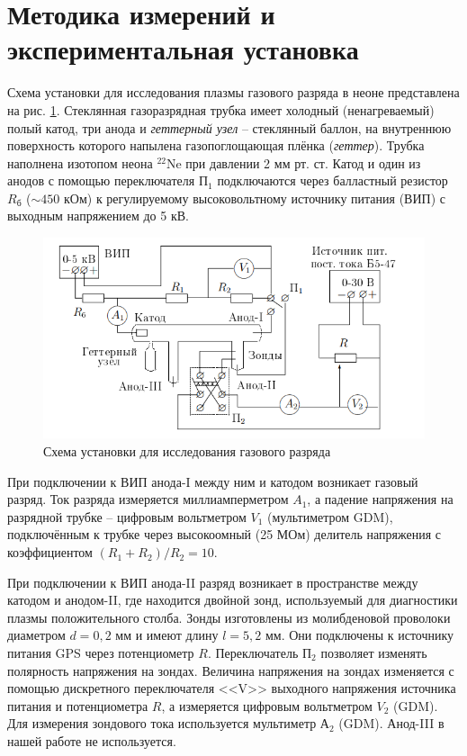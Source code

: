 \documentclass[a4paper, 12pt]{article}
\begin{document}
    \newpage
    
    \section{Методика измерений и экспериментальная установка}

    Схема установки для исследования плазмы газового разряда в неоне представлена на рис. \ref{installation}. Стеклянная газоразрядная трубка имеет холодный (ненагреваемый) полый катод, три анода и \textit{геттерный узел} -- стеклянный баллон, на внутреннюю поверхность которого напылена газопоглощающая плёнка (\textit{геттер}). Трубка наполнена изотопом неона $^{22}\text{Ne}$ при давлении 2 мм рт. ст. Катод и один из анодов с помощью переключателя $\text{П}_1$ подключаются через балластный резистор $R_\text{б}$ ($\sim 450$ кОм) к регулируемому высоковольтному источнику питания (ВИП) с выходным напряжением до 5 кВ.

    \begin{figure}[H]
        \centering
        \includegraphics[width = 14 cm]{images/installation.png}
        \caption{Схема установки для исследования газового разряда}
        \label{installation}
    \end{figure}

    При подключении к ВИП анода-I между ним и катодом возникает газовый разряд. Ток разряда измеряется миллиамперметром $A_1$, а падение напряжения на разрядной трубке -- цифровым вольтметром $V_1$ (мультиметром GDM), подключённым к трубке через высокоомный (25 МОм) делитель напряжения с коэффициентом $\left( R_1 + R_2 \right)/R_2 = 10$.
    
    При подключении к ВИП анода-II разряд возникает в пространстве между катодом и анодом-II, где находится двойной зонд, используемый для диагностики плазмы положительного столба. Зонды изготовлены из молибденовой проволоки диаметром $d = 0,2$ мм и имеют длину $l = 5,2$ мм. Они подключены к источнику питания GPS через потенциометр $R$. Переключатель $\text{П}_2$ позволяет изменять полярность напряжения на зондах. Величина напряжения на зондах изменяется с помощью дискретного переключателя <<V>> выходного напряжения источника питания и потенциометра $R$, а измеряется цифровым вольтметром $V_2$ (GDM). Для измерения зондового тока используется мультиметр $А_2$ (GDM). Анод-III в нашей работе не используется.
\end{document}
